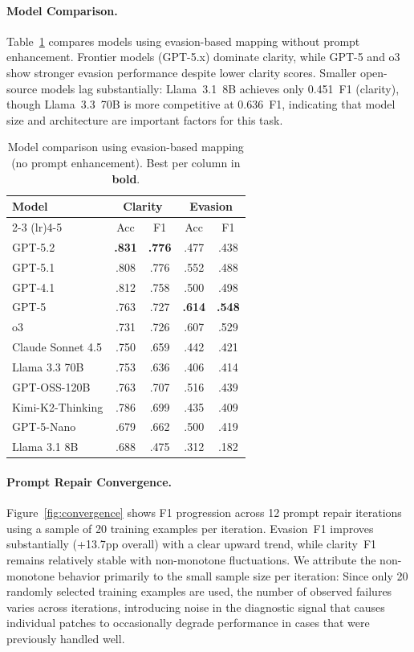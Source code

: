 \documentclass[11pt]{article}
\begin{document}
\paragraph{Model Comparison.}
Table~\ref{tab:models} compares models using evasion-based mapping without prompt enhancement.
Frontier models (GPT-5.x) dominate clarity, while GPT-5 and o3 show stronger evasion performance despite lower clarity scores.
Smaller open-source models lag substantially: Llama~3.1~8B achieves only 0.451~F1 (clarity), though Llama~3.3~70B is more competitive at 0.636~F1, indicating that model size and architecture are important factors for this task.

\begin{table}[htb]
\centering
\small
\begin{tabular}{@{}lcccc@{}}
\toprule
\textbf{Model} & \multicolumn{2}{c}{\textbf{Clarity}} & \multicolumn{2}{c}{\textbf{Evasion}} \\
\cmidrule(lr){2-3} \cmidrule(lr){4-5}
 & Acc & F1 & Acc & F1 \\
\midrule
GPT-5.2 & \textbf{.831} & \textbf{.776} & .477 & .438 \\
GPT-5.1 & .808 & .776 & .552 & .488 \\
GPT-4.1 & .812 & .758 & .500 & .498 \\
GPT-5 & .763 & .727 & \textbf{.614} & \textbf{.548} \\
o3 & .731 & .726 & .607 & .529 \\
Claude Sonnet 4.5 & .750 & .659 & .442 & .421 \\
Llama 3.3 70B & .753 & .636 & .406 & .414 \\
GPT-OSS-120B & .763 & .707 & .516 & .439 \\
Kimi-K2-Thinking & .786 & .699 & .435 & .409 \\
GPT-5-Nano & .679 & .662 & .500 & .419 \\
Llama 3.1 8B & .688 & .475 & .312 & .182 \\
\bottomrule
\end{tabular}
\caption{Model comparison using evasion-based mapping (no prompt enhancement). Best per column in \textbf{bold}.}
\label{tab:models}
\end{table}

\paragraph{Prompt Repair Convergence.}
Figure~\ref{fig:convergence} shows F1 progression across 12 prompt repair iterations using a sample of 20 training examples per iteration.
Evasion~F1 improves substantially (+13.7pp overall) with a clear upward trend, while clarity~F1 remains relatively stable with non-monotone fluctuations.
We attribute the non-monotone behavior primarily to the small sample size per iteration: Since only 20 randomly selected training examples are used, the number of observed failures varies across iterations, introducing noise in the diagnostic signal that causes individual patches to occasionally degrade performance in cases that were previously handled well.
\end{document}
